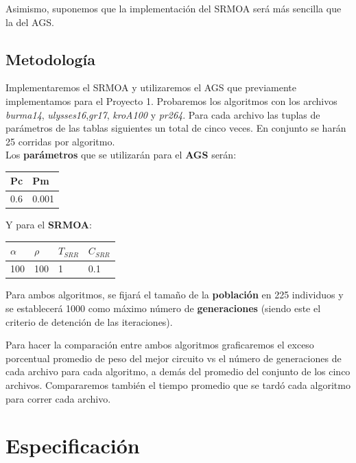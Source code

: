 \documentclass[12pt]{article}
\begin{document}
Asimismo, suponemos que la implementación del SRMOA será más sencilla que la del AGS.
\subsection*{Metodología}\label{sec:met}
Implementaremos el SRMOA y utilizaremos el AGS que previamente implementamos para el Proyecto 1. Probaremos los algoritmos con los archivos \textit{burma14}, \textit{ulysses16},\textit{gr17}, \textit{kroA100} y \textit{pr264}. Para cada archivo las tuplas de parámetros de las tablas siguientes un total de cinco veces. En conjunto se harán 25 corridas por algoritmo.\\


Los \textbf{parámetros} que se utilizarán para el \textbf{AGS} serán:
\begin{center}
\begin{tabularx}{0.25\textwidth}{|X|X|}
  \hline
\textbf{Pc} &  \textbf{Pm} \\ \hline
0.6 & 0.001 \\ \hline
\end{tabularx}
\end{center}

Y para el \textbf{SRMOA}:
\begin{center}
\begin{tabularx}{0.30\textwidth}{|X|X|X|X|}
  \hline
\textbf{$\alpha$} &  \textbf{$\rho$} & \textbf{$T_{SRR}$} & \textbf{$C_{SRR}$}\\ \hline
100 & 100 & 1 & 0.1 \\ \hline
\end{tabularx}
\end{center}

Para ambos algoritmos, se fijará el tamaño de la \textbf{población} en 225 individuos y se establecerá 1000 como máximo número de \textbf{generaciones} (siendo este el criterio de detención de las iteraciones).

Para hacer la comparación entre ambos algoritmos graficaremos el exceso porcentual promedio de peso del mejor circuito vs el número de generaciones de cada archivo para cada algoritmo, a demás del promedio del conjunto de los cinco archivos. Compararemos también el tiempo promedio que se tardó cada algoritmo para correr cada archivo.

\newpage

\section{Especificación}\label{sec:esp}
\end{document}
